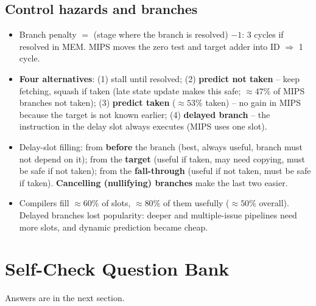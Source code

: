 \documentclass[11pt]{article}
\begin{document}
\subsection{Control hazards and branches}
\begin{itemize}[leftmargin=*]
  \item Branch penalty $=$ (stage where the branch is resolved) $-1$: 3 cycles
  if resolved in MEM. MIPS moves the zero test and target adder into ID
  $\Rightarrow$ 1 cycle.
  \item \textbf{Four alternatives}: (1) stall until resolved; (2)
  \textbf{predict not taken} -- keep fetching, squash if taken (late state
  update makes this safe; $\approx47\%$ of MIPS branches not taken); (3)
  \textbf{predict taken} ($\approx53\%$ taken) -- no gain in MIPS because the
  target is not known earlier; (4) \textbf{delayed branch} -- the
  instruction in the delay slot always executes (MIPS uses one slot).
  \item Delay-slot filling: from \textbf{before} the branch (best, always
  useful, branch must not depend on it); from the \textbf{target} (useful if
  taken, may need copying, must be safe if not taken); from the
  \textbf{fall-through} (useful if not taken, must be safe if taken).
  \textbf{Cancelling (nullifying) branches} make the last two easier.
  \item Compilers fill $\approx60\%$ of slots, $\approx80\%$ of them usefully
  ($\approx50\%$ overall). Delayed branches lost popularity: deeper and
  multiple-issue pipelines need more slots, and dynamic prediction became
  cheap.
\end{itemize}

\section{Self-Check Question Bank}

Answers are in the next section.
\end{document}
